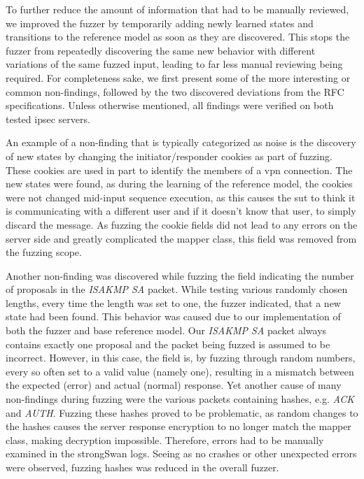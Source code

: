To further reduce the amount of information that had to be manually reviewed, we improved the fuzzer by temporarily adding newly learned states and transitions to the reference model as soon as they are discovered. This stops the fuzzer from repeatedly discovering the same new behavior with different variations of the same fuzzed input, leading to far less manual reviewing being required. For completeness sake, we first present some of the more interesting or common non-findings, followed by the two discovered deviations from the RFC specifications. Unless otherwise mentioned, all findings were verified on both tested \ac{ipsec} servers.

An example of a non-finding that is typically categorized as noise is the discovery of new states by changing the initiator/responder cookies as part of fuzzing. These cookies are used in part to identify the members of a \ac{vpn} connection. The new states were found, as during the learning of the reference model, the cookies were not changed mid-input sequence execution, as this causes the \ac{sut} to think it is communicating with a different user and if it doesn't know that user, to simply discard the message. As fuzzing the cookie fields did not lead to any errors on the server side and greatly complicated the mapper class, this field was removed from the fuzzing scope. 

Another non-finding was discovered while fuzzing the field indicating the number of proposals in the \emph{ISAKMP SA} packet. While testing various randomly chosen lengths, every time the length was set to one, the fuzzer indicated, that a new state had been found. This behavior was caused due to our implementation of both the fuzzer and base reference model. Our \emph{ISAKMP SA} packet always contains exactly one proposal and the packet being fuzzed is assumed to be incorrect. However, in this case, the field is, by fuzzing through random numbers, every so often set to a valid value (namely one), resulting in a mismatch between the expected (error) and actual (normal) response. 
Yet another cause of many non-findings during fuzzing were the various packets containing hashes, e.g. \emph{ACK} and \emph{AUTH}. Fuzzing these hashes proved to be problematic, as random changes to the hashes causes the server response encryption to no longer match the mapper class, making decryption impossible. Therefore, errors had to be manually examined in the strongSwan logs. Seeing as no crashes or other unexpected errors were observed, fuzzing hashes was reduced in the overall fuzzer. 

